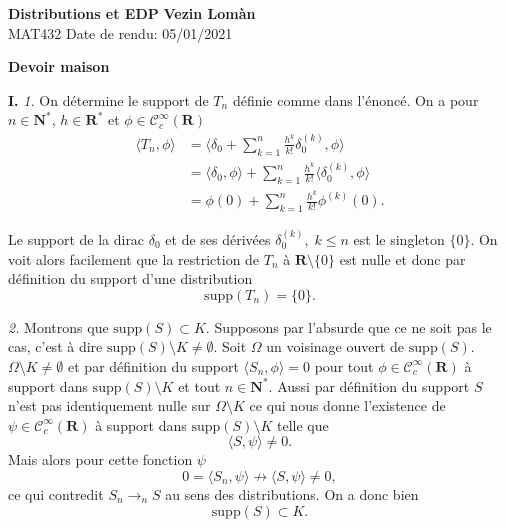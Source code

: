 \documentclass[12pt]{article}
\newcommand{\R}{\mathbf{R}}
\newcommand{\N}{\mathbf{N}}
\begin{document}
        \noindent
\textbf{Distributions et EDP} \hfill \textbf{Vezin Lomàn}\\
\normalsize MAT432 \hfill Date de rendu: 05/01/2021\\

\begin{center}
\textbf{Devoir maison}
\end{center}

\textbf{I.} \textit{1.} On détermine le support de $T_{n}$ définie comme dans l'énoncé. On a pour $n \in \N^{*}$, $h \in \R^{*}$ et $\phi \in \mathcal{C}_{c}^{\infty}(\R)$
\begin{align*}
        \langle T_{n}, \phi \rangle &= \langle \delta_{0} + \sum_{k=1}^{n} \frac{h^{k}}{k!}\delta^{(k)}_{0}, \phi \rangle \\
                                    &= \langle \delta_{0}, \phi \rangle + \sum_{k=1}^{n} \frac{h^{k}}{k!}\langle \delta^{(k)}_{0}, \phi \rangle \\
                                    &= \phi(0) + \sum_{k=1}^{n} \frac{h^{k}}{k!}\phi^{(k)}(0) 
.\end{align*}

Le support de la dirac $\delta_{0}$ et de ses dérivées $\delta^{(k)}_{0}, \; k \le n$ est le singleton $\{0\}$. On voit alors facilement que la restriction de $T_{n}$ à $\R \setminus \{0\}$ est nulle et donc par définition du support d'une distribution \[
        \boxed{\mathrm{supp}(T_{n}) = \{0\}.} 
\] 

\bigskip

\textit{2.} Montrons que $\mathrm{supp}(S) \subset K$.
Supposons par l'absurde que ce ne soit pas le cas, c'est à dire $\mathrm{supp}(S)\setminus K \neq \emptyset$. Soit $\Omega$ un voisinage ouvert de $\mathrm{supp}(S)$. $\Omega \setminus K \neq \emptyset$ et par définition du support $\langle S_{n}, \phi \rangle = 0$ pour tout $\phi \in \mathcal{C}_{c}^{\infty}(\R)$ à support dans $\mathrm{supp}(S)\setminus K$ et tout $n \in \N^{*}$. Aussi par définition du support $S$ n'est pas identiquement nulle sur $\Omega \setminus K$ ce qui nous donne l'existence de $\psi \in \mathcal{C}_{c}^{\infty}(\R)$ à support dans $\mathrm{supp}(S)\setminus K$ telle que \[
        \langle S, \psi \rangle \neq 0
.\] Mais alors pour cette fonction $\psi$  \[
0 = \langle S_{n}, \psi \rangle \not\to \langle S, \psi \rangle \neq 0 
,\] ce qui contredit $S_{n} \to_{n} S$ au sens des distributions. On a donc bien \[
        \boxed{\mathrm{supp}(S) \subset K.}
\]  
        
\bigskip
\end{document}
